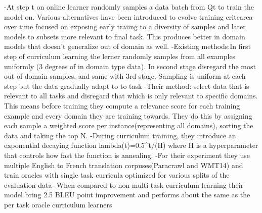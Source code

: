 -At step t on online learner randomly samples a data batch from Qt to train the model on. Various alternatives have been introduced to evolve training critearea over time focused on exposing early traiing to a diversity of samples and later models to subsets more relevant to final task. This produces better in domain models that doesn't generalize out of domain as well. 
-Existing methods:In first step of curriculum learning the lerner randomly samples from all examples uniformly (3 degrees of in domain type data). In second stage disregard the most out of domain samples, and same with 3rd stage. Sampling is uniform at each step but the data gradually adapt to to task
-Their method: select data that is relevant to all tasks and disregard that which is only relevant to specific domains. This means before training they compute a relevance score for each training example and every domain they are training towards. They do this by assigning each sample a weighted score per instance(representing all domains), sorting the data and taking the top N.
-During curriculum training, they introduce an exponential decaying function lambda(t)=0.5^t/(H) where H is a hyperparameter that controls how fast the function is annealing. 
-For their experiment they use multiple English to French translation corpuses(Paracrawl and WMT14) and train oracles with single task curricula optimized for various splits of the evaluation data
-When compared to non multi task curriculum learning their model bring 2.5 BLEU point improvement and performs about the same as the per task oracle curriculum learners 

